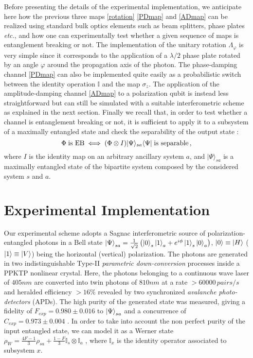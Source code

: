 \documentclass[aps,twocolumn,pra,superscriptaddress,showpacs,showkeys,floatfix]{revtex4-1}
\begin{document}
Before presenting the details of the experimental implementation, we anticipate here  how the previous three maps \eqref{rotation} \eqref{PDmap} and \eqref{ADmap} can be realized using standard bulk optics elements such as beam splitters, phase plates {\it etc.}, and how one can experimentally test whether a given sequence of maps is entanglement breaking or not.
The implementation of the unitary rotation $\Lambda_\varphi$ is very simple since it corresponds to the application of a $\lambda/2$ phase plate rotated by an angle $\varphi$ around the propagation axis of the photon. The phase-damping channel \eqref{PDmap} can also be implemented quite easily as a probabilistic switch between the identity operation $\mathbb{I}$ and the map $\sigma_{z}$. The application of the amplitude-damping channel \eqref{ADmap} to a polarization qubit is instead less straightforward but can still be simulated with a suitable interferometric scheme as explained in the next section.  Finally 
we recall that, in order to test whether a channel is entanglement breaking or not, it is sufficient to apply it to a subsystem of a maximally entangled state and check the separability of the output state \cite{horodecki2003}: 
\begin{equation}\label{eq:EBtest}
\Phi  \; {\rm is\ EB} \iff  (\Phi \otimes I) |\Psi \rangle_{sa} \langle \Psi|  \; {\rm is\ separable}\,,
\end{equation}
where $I$ is the identity map on an arbitrary ancillary system $a$, and $|\Psi \rangle_{sa}$ is a maximally entangled state of the bipartite system composed by the considered system $s$ and $a$. 

\section{Experimental Implementation}
Our experimental scheme adopts a Sagnac interferometric source of polarization-entangled photons \cite{source} in a Bell state $\ket{\Psi}_{sa}=\frac{1}{\sqrt{2}}\left(\ket{0}_{s}\ket{1}_{a}+e^{i\phi}\ket{1}_{s}\ket{0}_{a}\right)$, $\ket{0}\equiv\ket{H}$ ($\ket{1}\equiv\ket{V}$) being  the horizontal (vertical) polarization. The photons are generated in two indistinguishable Type-II \textit{parametric down-conversion} processes inside a PPKTP nonlinear crystal. Here, the photons belonging to a continuous wave laser of $405nm$ are converted into twin photons of $810nm$ at a rate $>60000 \, pairs/s$ and heralded efficiency $>16\%$ revealed by two synchronized \textit{avalanche photo-detectors} (APDs). The high purity of the generated state was measured, giving a fidelity of $F_{exp}=0.980\pm0.016$ to $\ket{\Psi}_{sa}$ \cite{entanglement} and a concurrence of $C_{exp}=0.973\pm0.004$ \cite{concurrence}. 
In order to take into account the non perfect purity of the input entangled state, we can model it as a Werner state $\rho_{W}=\frac{4F-1}{3}\rho_{sa}+\frac{1-F}{3}\mathbb{I}_{s}\otimes\mathbb{I}_{a}$ \cite{wernerstate,channelcapacity}, where $\mathbb{I}_x$ is the identity operator associated to subsystem $x$.
\end{document}
